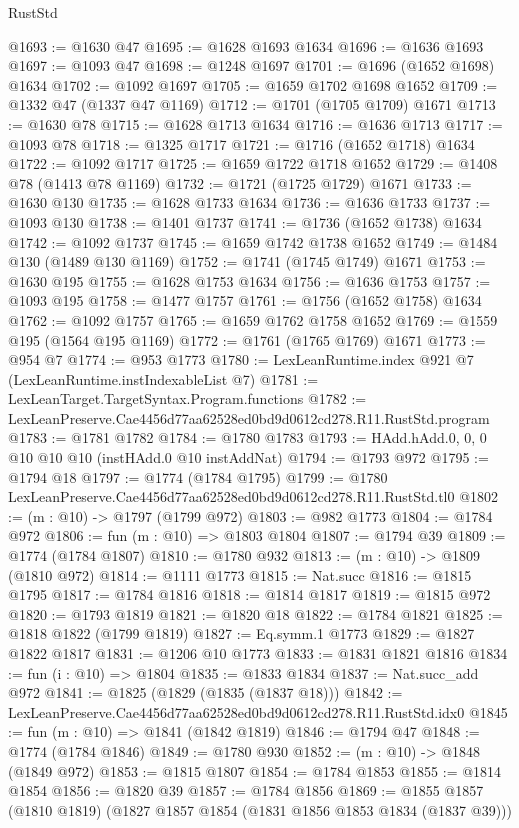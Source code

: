 \begin{lexlean}{RustStd}
\begin{coremodule}
@1693 := @1630 @47
@1695 := @1628 @1693 @1634
@1696 := @1636 @1693
@1697 := @1093 @47
@1698 := @1248 @1697
@1701 := @1696 (@1652 @1698) @1634
@1702 := @1092 @1697
@1705 := @1659 @1702 @1698 @1652
@1709 := @1332 @47 (@1337 @47 @1169)
@1712 := @1701 (@1705 @1709) @1671
@1713 := @1630 @78
@1715 := @1628 @1713 @1634
@1716 := @1636 @1713
@1717 := @1093 @78
@1718 := @1325 @1717
@1721 := @1716 (@1652 @1718) @1634
@1722 := @1092 @1717
@1725 := @1659 @1722 @1718 @1652
@1729 := @1408 @78 (@1413 @78 @1169)
@1732 := @1721 (@1725 @1729) @1671
@1733 := @1630 @130
@1735 := @1628 @1733 @1634
@1736 := @1636 @1733
@1737 := @1093 @130
@1738 := @1401 @1737
@1741 := @1736 (@1652 @1738) @1634
@1742 := @1092 @1737
@1745 := @1659 @1742 @1738 @1652
@1749 := @1484 @130 (@1489 @130 @1169)
@1752 := @1741 (@1745 @1749) @1671
@1753 := @1630 @195
@1755 := @1628 @1753 @1634
@1756 := @1636 @1753
@1757 := @1093 @195
@1758 := @1477 @1757
@1761 := @1756 (@1652 @1758) @1634
@1762 := @1092 @1757
@1765 := @1659 @1762 @1758 @1652
@1769 := @1559 @195 (@1564 @195 @1169)
@1772 := @1761 (@1765 @1769) @1671
@1773 := @954 @7
@1774 := @953 @1773
@1780 := LexLeanRuntime.index @921 @7 (LexLeanRuntime.instIndexableList @7)
@1781 := LexLeanTarget.TargetSyntax.Program.functions
@1782 := LexLeanPreserve.Cae4456d77aa62528ed0bd9d0612cd278.R11.RustStd.program
@1783 := @1781 @1782
@1784 := @1780 @1783
@1793 := HAdd.hAdd.{0, 0, 0} @10 @10 @10 (instHAdd.{0} @10 instAddNat)
@1794 := @1793 @972
@1795 := @1794 @18
@1797 := @1774 (@1784 @1795)
@1799 := @1780 LexLeanPreserve.Cae4456d77aa62528ed0bd9d0612cd278.R11.RustStd.tl0
@1802 := (m : @10) -> @1797 (@1799 @972)
@1803 := @982 @1773
@1804 := @1784 @972
@1806 := fun (m : @10) => @1803 @1804
@1807 := @1794 @39
@1809 := @1774 (@1784 @1807)
@1810 := @1780 @932
@1813 := (m : @10) -> @1809 (@1810 @972)
@1814 := @1111 @1773
@1815 := Nat.succ
@1816 := @1815 @1795
@1817 := @1784 @1816
@1818 := @1814 @1817
@1819 := @1815 @972
@1820 := @1793 @1819
@1821 := @1820 @18
@1822 := @1784 @1821
@1825 := @1818 @1822 (@1799 @1819)
@1827 := Eq.symm.{1} @1773
@1829 := @1827 @1822 @1817
@1831 := @1206 @10 @1773
@1833 := @1831 @1821 @1816
@1834 := fun (i : @10) => @1804
@1835 := @1833 @1834
@1837 := Nat.succ_add @972
@1841 := @1825 (@1829 (@1835 (@1837 @18)))
@1842 := LexLeanPreserve.Cae4456d77aa62528ed0bd9d0612cd278.R11.RustStd.idx0
@1845 := fun (m : @10) => @1841 (@1842 @1819)
@1846 := @1794 @47
@1848 := @1774 (@1784 @1846)
@1849 := @1780 @930
@1852 := (m : @10) -> @1848 (@1849 @972)
@1853 := @1815 @1807
@1854 := @1784 @1853
@1855 := @1814 @1854
@1856 := @1820 @39
@1857 := @1784 @1856
@1869 := @1855 @1857 (@1810 @1819) (@1827 @1857 @1854 (@1831 @1856 @1853 @1834 (@1837 @39)))

\end{coremodule}
\end{lexlean}
